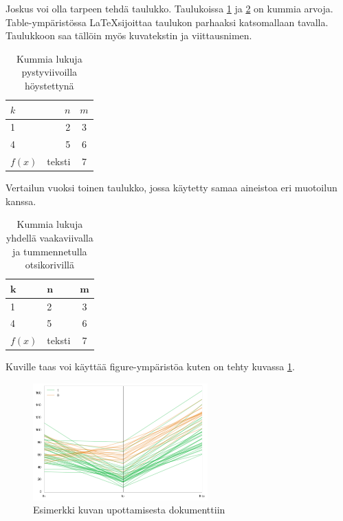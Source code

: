\documentclass[12pt, titlepage]{article}
\theoremstyle{definition}
\begin{document}
Joskus voi olla tarpeen tehdä taulukko. Taulukoissa \ref{taulukko1} ja \ref{taulukko2} on kummia arvoja. Table-ympäristössa \LaTeX sijoittaa taulukon parhaaksi katsomallaan tavalla. Taulukkoon saa tällöin myös kuvatekstin ja viittausnimen.
\begin{table}[!h] %
\begin{center}
\begin{tabular}{|lr||c}%
$k$& $n$ & $m$\\
\hline
1 & 2 & 3\\
4 & 5 & 6\\
$f(x)$ & teksti & 7\\
\end{tabular}
\caption{Kummia lukuja pystyviivoilla höystettynä}\label{taulukko1}
\end{center}
\end{table}

Vertailun vuoksi toinen taulukko, jossa käytetty samaa aineistoa eri muotoilun kanssa.

\begin{table}[!h] %
\begin{center}
\begin{tabular}{llc}%
$\textbf{k}$& $\textbf{n}$ & $\textbf{m}$\\
\hline
1 & 2 & 3\\
4 & 5 & 6\\
$f(x)$ & teksti & 7\\
\end{tabular}
\caption{Kummia lukuja yhdellä vaakaviivalla ja tummennetulla otsikorivillä}\label{taulukko2}
\end{center}
\end{table}


Kuville taas voi käyttää figure-ympäristöa kuten on tehty kuvassa \ref{kuva}.
\begin{figure}[h!]
\begin{center}
\includegraphics[width=0.6\textwidth]{figure_esimerkki.png}
\caption{Esimerkki kuvan upottamisesta dokumenttiin}
\label{kuva}
\end{center}
\end{figure}
\end{document}
